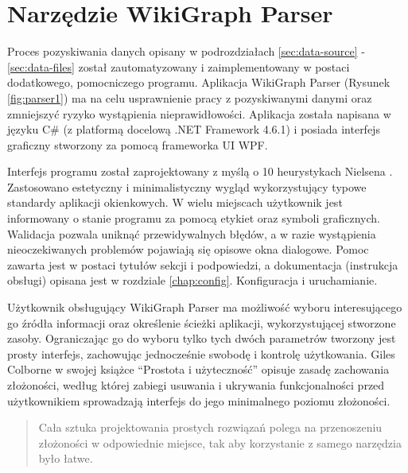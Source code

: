 \section{Narzędzie WikiGraph Parser}
\label{sec:parser-tool}
Proces pozyskiwania danych opisany w podrozdziałach \ref{sec:data-source} - \ref{sec:data-files} został zautomatyzowany i zaimplementowany w postaci dodatkowego, pomocniczego programu. Aplikacja WikiGraph Parser (Rysunek \ref{fig:parser1}) ma na celu usprawnienie pracy z pozyskiwanymi danymi oraz zmniejszyć ryzyko wystąpienia nieprawidłowości. Aplikacja została napisana w języku C# (z platformą docelową .NET Framework 4.6.1) i posiada interfejs graficzny stworzony za pomocą frameworka UI WPF.

Interfejs programu został zaprojektowany z myślą o 10 heurystykach Nielsena \cite{Heuristics}. Zastosowano estetyczny i minimalistyczny wygląd wykorzystujący typowe standardy aplikacji okienkowych. W wielu miejscach użytkownik jest informowany o stanie programu za pomocą etykiet oraz symboli graficznych. Walidacja pozwala uniknąć przewidywalnych błędów, a w razie wystąpienia nieoczekiwanych problemów pojawiają się opisowe okna dialogowe. Pomoc zawarta jest w postaci tytułów sekcji i podpowiedzi, a dokumentacja (instrukcja obsługi) opisana jest w rozdziale \ref{chap:config}. Konfiguracja i uruchamianie.


Użytkownik obsługujący WikiGraph Parser ma możliwość wyboru interesującego go źródła informacji oraz określenie ścieżki aplikacji, wykorzystującej stworzone zasoby. Ograniczając go do wyboru tylko tych dwóch parametrów tworzony jest prosty interfejs, zachowując jednocześnie swobodę i kontrolę użytkowania. Giles Colborne w swojej książce ``Prostota i użyteczność'' \cite{ProstotaUzytecznosc} opisuje zasadę zachowania złożoności, według której zabiegi usuwania i ukrywania funkcjonalności przed użytkownikiem sprowadzają interfejs do jego minimalnego poziomu złożoności.

\begin{center}
	\hyphenblockcquote{polish}{ProstotaUzytecznosc}{
        Cała sztuka projektowania prostych rozwiązań polega na przenoszeniu złożoności w odpowiednie miejsce, tak aby korzystanie z samego narzędzia było łatwe.
	}
\end{center}


